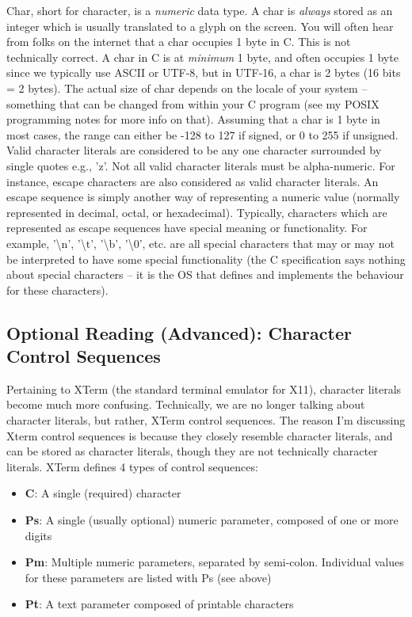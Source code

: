 \documentclass{article}
\begin{document}
Char, short for character, is a \textit{numeric} data type. A char is \textit{always} stored as an integer
which is usually translated to a glyph on the screen. You will often hear from folks on the internet that a
char occupies 1 byte in C. This is not technically correct. A char in C is at \textit{minimum} 1 byte, and
often occupies 1 byte since we typically use ASCII or UTF-8, but in UTF-16, a char is 2 bytes (16 bits = 2
bytes). The actual size of char depends on the locale of your system – something that can be changed from
within your C program (see my POSIX programming notes for more info on that). Assuming that a char is 1 byte
in most cases, the range can either be -128 to 127 if signed, or 0 to 255 if unsigned. Valid character
literals are considered to be any one character surrounded by single quotes e.g., 'z'. Not all valid character
literals must be alpha-numeric. For instance, escape characters are also considered as valid character
literals. An escape sequence is simply another way of representing a numeric value (normally represented in
decimal, octal, or hexadecimal). Typically, characters which are represented as escape sequences have special
meaning or functionality. For example, '\textbackslash{}n', '\textbackslash{}t', '\textbackslash{}b',
'\textbackslash{}0', etc. are all special characters that may or may not be interpreted to have some special
functionality (the C specification says nothing about special characters – it is the OS that defines and
implements the behaviour for these characters).

\subsection{Optional Reading (Advanced): Character Control Sequences}

Pertaining to XTerm (the standard terminal emulator for X11), character literals become much more confusing.
Technically, we are no longer talking about character literals, but rather, XTerm control sequences. The
reason I’m discussing Xterm control sequences is because they closely resemble character literals, and can be
stored as character literals, though they are not technically character literals. XTerm defines 4 types of
control sequences:

\begin{itemize}

\item{%
    \textbf{C}:  A single (required) character
}

\item{%
    \textbf{Ps}: A single (usually optional) numeric parameter, composed of one or more digits
}

\item{%
    \textbf{Pm}: Multiple numeric parameters, separated by semi-colon. Individual values for these parameters
    are listed with Ps (see above)
}

\item{%
    \textbf{Pt}: A text parameter composed of printable characters
}

\end{itemize}
\end{document}
